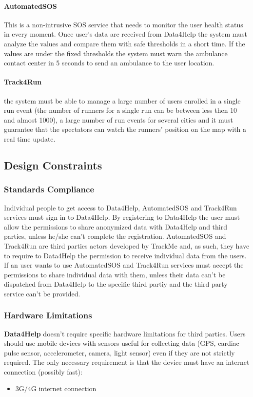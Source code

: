 \documentclass[a4paper]{article}
\begin{document}
    \paragraph{AutomatedSOS} This is a non-intrusive SOS service that needs to monitor the user health status in every moment. Once user's data are received from Data4Help the system must analyze the values and compare them with safe thresholds in a short time. If the values are under the fixed thresholds the system must warn the ambulance contact center in 5 seconds to send an ambulance to the user location.
    
    \paragraph{Track4Run} the system must be able to manage a large number of users enrolled in a single run event (the number of runners for a single run can be between less then 10 and almost 1000), a large number of run events for several cities and it must guarantee that the spectators can watch the runners' position on the map with a real time update.
    
    
    \subsection{Design Constraints}
    
    \subsubsection{Standards Compliance}
    
    Individual people to get access to Data4Help, AutomatedSOS and Track4Run services must sign in to Data4Help. By registering to Data4Help the user must allow the permissions to share anonymized data with Data4Help and third parties, unless he/she can't complete the registration.
    AutomatedSOS and Track4Run are third parties actors developed by TrackMe and, as such, they have to require to Data4Help the permission to receive individual data from the users.
    If an user wants to use AutomatedSOS and Track4Run services must accept the permissions to share individual data with them, unless their data can't be dispatched from Data4Help to the specific third partiy and the third party service can't be provided.
    
    \subsubsection{Hardware Limitations}
 \textbf{Data4Help} doesn't require specific hardware limitations for third parties. Users should use mobile devices with sensors useful for collecting data (GPS, cardiac pulse sensor, accelerometer, camera, light sensor) even if they are not strictly required. The only necessary requirement is that the device must have an internet connection (possibly fast):
    \begin{itemize}
        \item 3G/4G internet connection
    \end{itemize}
    
\end{document}
